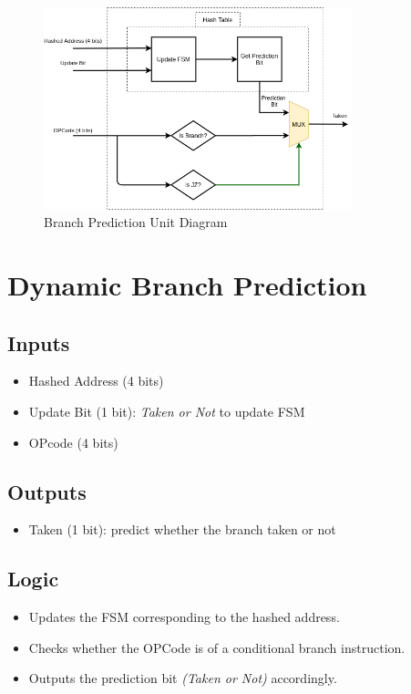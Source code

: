 \documentclass[12pt]{report}
\begin{document}
\begin{center}
    \begin{figure}[hp]
        \centering
        \includegraphics[width=0.8\textwidth]{bpu}
        \caption{Branch Prediction Unit Diagram}
        \label{fig:bpu}
    \end{figure}
\end{center}

\section{Dynamic Branch Prediction}

\subsection{Inputs}
\begin{itemize}
    \item Hashed Address (4 bits)
    \item Update Bit (1 bit): \emph{Taken or Not}  to update FSM
    \item OPcode (4 bits)
\end{itemize}

\subsection{Outputs}
\begin{itemize}
    \item Taken (1 bit): predict whether the branch taken or not
\end{itemize}

\subsection{Logic}
\begin{itemize}
    \item Updates the FSM corresponding to the hashed address.
    \item Checks whether the OPCode is of a conditional branch instruction.
    \item Outputs the prediction bit \emph{(Taken or Not)} accordingly.
\end{itemize}
\end{document}
